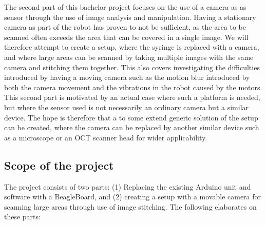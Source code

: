 \documentclass[a4paper,11pt]{article}
\begin{document}
The second part of this bachelor project focuses on the use of a camera
as as sensor through the use of image analysis and manipulation. Having
a stationary camera as part of the robot has proven to not be
sufficient, as the area to be scanned often exceeds the area that can be
covered in a single image. We will therefore attempt to create a setup,
where the syringe is replaced with a camera, and where large areas can
be scanned by taking multiple images with the same camera and stitching
them together. This also covers investigating the difficulties
introduced by having a moving camera such as the motion blur introduced
by both the camera movement and the vibrations in the robot caused by
the motors. This second part is motivated by an actual case where such a
platform is needed, but where the sensor used is not necessarily an
ordinary camera but a similar device. The hope is therefore that a to
some extend generic solution of the setup can be created, where the
camera can be replaced by another similar device such as a microscope or
an OCT scanner head for wider applicability.

\subsection{Scope of the project}
The project consists of two parts: (1) Replacing the existing Arduino
unit and software with a BeagleBoard, and (2) creating a setup with a
movable camera for scanning large areas through use of image stitching.
The following elaborates on these parts:
\end{document}
